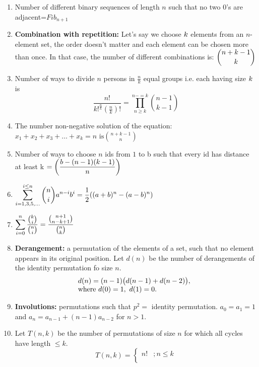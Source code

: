 \begin{enumerate}
    \item Number of different binary sequences of length $n$ such that no two $0$’s are adjacent=$\displaystyle Fib_{n+1}$
    \item \textbf{Combination with repetition:} Let’s say we choose $\displaystyle \displaystyle k$ elements from an $n$-element set, the order doesn’t matter and each element can be chosen more than once. In that case, the number of different combinations is: $\displaystyle \displaystyle {n+k-1 \choose k}$
    \item Number of ways to divide $n$ persons in $\displaystyle \frac{n}{k}$ equal groups i.e. each having size $\displaystyle \displaystyle k$ is
          \[\displaystyle \frac{n!}{k!^{\frac{n}{k}} \left( \frac{n}{k} \right) !}= \prod \limits_{n \geq k}^{n-=k}{n-1 \choose k-1}\]
    \item The number non-negative solution of the equation: $\displaystyle x_1+x_2+x_3+\dots+x_k=n \text{ is}{n+k-1 \choose n}$
    \item Number of ways to choose $n$ ids from $\displaystyle 1$ to b such that every id has distance at least k $\displaystyle \displaystyle =\left( \frac{b-(n-1)(k-1)}{n} \right)$
    \item $\displaystyle \displaystyle \sum \limits_{i=1,3,5,\dots}^{i\leq n} \binom{n}{i} a^{n-i}b^i = \frac{1}{2} ((a+b)^n-(a-b)^n)$
    \item $\displaystyle \displaystyle \sum \limits_{i=0}^{n} \dfrac{\binom{k}{i}}{\binom{n}{i}} = \dfrac{\binom{n+1}{n-k+1}}{\binom{n}{k}}$
    \item \textbf{Derangement:} a permutation of the elements of a set, such that no element appears in its original position. Let $d(n)$ be the number of derangements of the identity permutation fo size $n$.
          \[\begin{array}{@{}l}d(n) = (n - 1)\bigl(d(n - 1) + d(n - 2)\bigr),\\ \text{where } d(0)=1,\ d(1)=0.\end{array}\]
    \item \textbf{Involutions:} permutations such that $\displaystyle p^2 =$ identity permutation. $\displaystyle a_0 = a_1 = 1$ and $\displaystyle a_n=a_{n-1} + (n-1)a_{n-2}$ for $n>1$.
    \item Let $T(n,k)$ be the number of permutations of size $n$ for which all cycles have length $\displaystyle \leq k$.
          \[T(n, k)=
              \begin{cases}
                  n! & ; n \le k    \\

\end{cases}\]
\end{enumerate}
